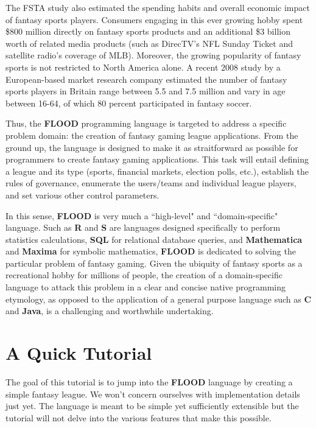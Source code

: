 \documentclass[12pt]{report}
\begin{document}
The FSTA study also estimated the spending habits and overall economic impact of fantasy sports players. Consumers engaging in this ever growing hobby spent \$800 million directly on fantasy sports products and an additional \$3 billion worth of related media products (such as DirecTV's NFL Sunday Ticket and satellite radio's coverage of MLB). Moreover, the growing popularity of fantasy sports is not restricted to North America alone. A recent 2008 study by a European-based market research company estimated the number of fantasy sports players in Britain range between 5.5 and 7.5 million and vary in age between 16-64, of which 80 percent participated in fantasy soccer.

Thus, the \textbf{FLOOD} programming language is targeted to address a specific problem domain: the creation of fantasy gaming league applications. From the ground up, the language is designed to make it as straitforward as possible for programmers to create fantasy gaming applications. This task will entail defining a league and its type (sports, financial markets, election polls, etc.), establish the rules of governance, enumerate the users/teams and individual league players, and set various other control parameters. 

In this sense, \textbf{FLOOD} is very much a ``high-level" and ``domain-specific" language. Such as \textbf{R} and \textbf{S} are languages designed specifically to perform statistics calculations, \textbf{SQL} for relational database queries, and \textbf{Mathematica} and \textbf{Maxima} for symbolic mathematics, \textbf{FLOOD} is dedicated to solving the particular problem of fantasy gaming. Given the ubiquity of fantasy sports as a recreational hobby for millions of people, the creation of a domain-specific language to attack this problem in a clear and concise native programming etymology, as opposed to the application of a general purpose language such as \textbf{C} and \textbf{Java}, is a challenging and worthwhile undertaking.

\chapter{A Quick Tutorial}

The goal of this tutorial is to jump into the \textbf{FLOOD} language by creating a simple fantasy league. We won't concern ourselves with implementation details just yet. The language is meant to be simple yet sufficiently extensible but the tutorial will not delve into the various features that make this possible. 
\end{document}
